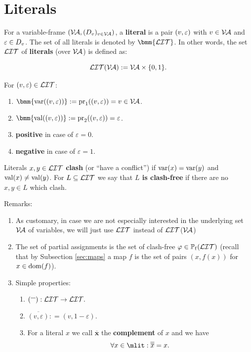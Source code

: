 \documentclass[12pt]{book}
\begin{document}
\section{Literals}
\label{sec:Litsvar}

\begin{defi}\label{def:litdervar}
  For a variable-frame $(\mathcal{V\hspace{-0.1em}A}, (D_v)_{v \in \mathcal{V\hspace{-0.1em}A}})$, a \textbf{literal} is a pair $(v,\varepsilon)$ with $v \in \mathcal{V\hspace{-0.1em}A}$ and $\varepsilon \in D_v$. The set of all literals is denoted by $\bmm{\Lit}$. In other words, the set $\mathcal{LIT}$ of \textbf{literals} (over $\mathcal{V\hspace{-0.1em}A}$) is defined as:

\begin{displaymath}
 \mathcal{LIT}( \mathcal{V\hspace{-0.1em}A}): = \mathcal{V\hspace{-0.1em}A} \times \{0,1\}.
 \end{displaymath}

For $(v,\varepsilon) \in \mathcal{LIT}$:
  \begin{enumerate}
  \item $\bmm{\var((v,\ve))} := \proj_1((v,\ve)) = v \in \Va$.
  \item $\bmm{\val((v,\ve))} := \proj_2((v,\ve)) = \ve$.
  \item \textbf{positive} in case of $\varepsilon = 0$.
  \item \textbf{negative} in case of $\varepsilon = 1$.
  \end{enumerate}
  Literals $x, y \in \mathcal{LIT}$ \textbf{clash} (or ``have a conflict'') if $\operatorname{var}(x) = \operatorname{var}(y)$ and $\operatorname{val}(x) \ne \operatorname{val}(y)$. For $L \subseteq \mathcal{LIT}$ we say that \textbf{$L$ is clash-free} if there are no $x, y \in L$ which clash.
\end{defi}
Remarks:
\begin{enumerate}
\item As customary, in case we are not especially interested in the underlying set   $\mathcal{V\hspace{-0.1em}A}$ of variables, we will just use  $\mathcal{LIT}$ instead of $\mathcal{LIT}$($\mathcal{V\hspace{-0.1em}A}$)
\item The set of partial assignments is the set of clash-free $\varphi \in \operatorname{\mathbb{P}_f}(\mathcal{LIT})$ (recall that by Subsection \ref{sec:maps} a map $f$ is the set of pairs $(x,f(x))$ for $x \in \operatorname{dom}(f)$).

\item Simple properties:
     \begin{enumerate}
      \item $({}^{\overline{~~}}): \mathcal{LIT} \to  \mathcal{LIT}.$
      \item $\overline{(v, \varepsilon)}: = (v, 1-\varepsilon).$
      \item For a literal $x$ we call $\overline{{\bm x}}$ the \textbf{complement} of $x$ and we have
      \begin{displaymath}
      \forall x \in \mlit: \overline{\overline{x}} = x.
      \end{displaymath}
     \end{enumerate}
\end{enumerate}
\end{document}
